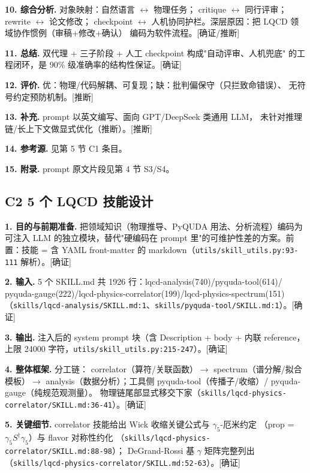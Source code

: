 \documentclass[UTF8]{ctexart}
\begin{document}
\noindent\textbf{10. 综合分析.} 对象映射：自然语言 $\leftrightarrow$ 物理任务；
critique $\leftrightarrow$ 同行评审；rewrite $\leftrightarrow$ 论文修改；
checkpoint $\leftrightarrow$ 人机协同护栏。深层原因：把 LQCD 领域协作惯例（审稿+修改+确认）
编码为软件流程。[确证/推断]

\noindent\textbf{11. 总结.} 双代理 + 三子阶段 + 人工 checkpoint 构成"自动评审、人机兜底"
的工程闭环，是 90\% 级准确率的结构性保证。[确证]

\noindent\textbf{12. 评价.} 优：物理/代码解耦、可复现；缺：批判偏保守（只拦致命错误）、
无符号约定预防机制。[推断]

\noindent\textbf{13. 补充.} prompt 以英文编写、面向 GPT/DeepSeek 类通用 LLM，
未针对推理链/长上下文做显式优化（推断）。[推断]

\noindent\textbf{14. 参考源.} 见第 5 节 C1 条目。

\noindent\textbf{15. 附录.} prompt 原文片段见第 4 节 S3/S4。

\subsection{C2 5 个 LQCD 技能设计}

\noindent\textbf{1. 目的与前期准备.} 把领域知识（物理推导、PyQUDA 用法、分析流程）编码为
可注入 LLM 的独立模块，替代"硬编码在 prompt 里"的可维护性差的方案。前置：技能 = 含 YAML
front-matter 的 markdown（\texttt{\nolinkurl{utils/skill_utils.py:93-111}} 解析）。[确证]

\noindent\textbf{2. 输入.} 5 个 SKILL.md 共 1926 行：lqcd-analysis(740)/pyquda-tool(614)/
pyquda-gauge(222)/lqcd-physics-correlator(199)/lqcd-physics-spectrum(151)
（\texttt{\nolinkurl{skills/lqcd-analysis/SKILL.md:1}}、\texttt{\nolinkurl{skills/pyquda-tool/SKILL.md:1}}）。[确证]

\noindent\textbf{3. 输出.} 注入后的 system prompt 块（含 Description + body + 内联 reference，
上限 24000 字符，\texttt{\nolinkurl{utils/skill_utils.py:215-247}}）。[确证]

\noindent\textbf{4. 整体框架.} 分工链：
\textcolor{phys}{correlator（算符/关联函数）$\rightarrow$ spectrum（谱分解/拟合模板）$\rightarrow$
analysis（数据分析）}；工具侧 pyquda-tool（传播子/收缩）/ pyquda-gauge（纯规范观测量）。
物理链尾部显式移交下家（\texttt{\nolinkurl{skills/lqcd-physics-correlator/SKILL.md:36-41}}）。[确证]

\noindent\textbf{5. 关键细节.} correlator 技能给出 Wick 收缩关键公式与 $\gamma_5$-厄米约定
（prop = $\gamma_5 S^\dagger \gamma_5$）与 flavor 对称性约化
（\texttt{\nolinkurl{skills/lqcd-physics-correlator/SKILL.md:88-98}}）；
DeGrand-Rossi 基 $\gamma$ 矩阵完整列出（\texttt{\nolinkurl{skills/lqcd-physics-correlator/SKILL.md:52-63}}）。[确证]
\end{document}
